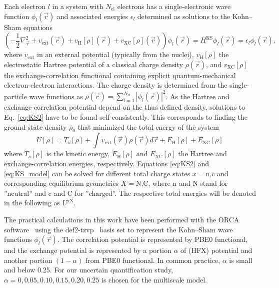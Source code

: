 \documentclass[letterpaper,12pt]{article}
\begin{document}
Each electron $l$ in a system with $N_\text{el}$ electrons has a single-electronic wave function $\phi_l (\vec{r})$ and associated energies $\epsilon_l$ determined as solutions to the Kohn--Sham equations~\cite{kohn_self_1965}
%
\begin{equation}
    \left(-\frac{1}{2}\nabla^2_{\vec{r}} + v_\text{ext}(\vec{r}) + v_\text{H}[\rho](\vec{r}) + v_\text{XC}[\rho](\vec{r})\right) \phi_l(\vec{r}) = H^\text{KS} \phi_l(\vec{r}) = \epsilon_l \phi_l (\vec{r}) ,
    \label{eq:KS2}
\end{equation}
%
where $v_\text{ext}$ in an external potential (typically from the nuclei), $v_\text{H}[\rho]$ the electrostatic Hartree potential of a classical charge density $\rho(\vec{r})$, and $v_\text{XC}[\rho]$ the exchange-correlation functional containing explicit quantum-mechanical electron-electron interactions. The charge density is determined from the single-particle wave functions as $\rho(\vec{r})=\sum\limits_{l=1}^{N_\text{el}} \left\vert\phi_l(\vec{r})\right\vert^2$. As the Hartree and exchange-correlation potential depend on the thus defined density, solutions to Eq.~\ref{eq:KS2} have to be found self-consistently. This corresponds to finding the ground-state density $\rho_0$ that minimized the total energy of the system
%
\begin{equation}
    U[\rho] = T_s[\rho] + \int v_\text{ext}(\vec{r}) \rho(\vec{r}) d \vec{r} + E_\text{H}[\rho] + E_\text{XC}[\rho]
    \label{eq:KS_model}
\end{equation}
%
where $T_s[\rho]$ is the kinetic energy, $E_\text{H}[\rho]$ and $E_\text{XC}[\rho]$ the Hartree and exchange-correlation energies, respectively. Equations \ref{eq:KS2} and \ref{eq:KS_model} can be solved for different total charge states $x=\text{n,c}$ and corresponding  equilibrium geometries $X=\text{N,C}$, where $\text{n}$ and $\text{N}$ stand for ''neutral'' and $\text{c}$ and $\text{C}$ for ''charged''. The respective total energies will be denoted in the following as $U^\text{xX}$.

The practical calculations in this work have been performed with the ORCA software~\cite{Neese2012a} using the def2-tzvp~\cite{weigend_accurate_2006} basis set to represent the Kohn--Sham wave functions $\phi_l(\vec{r})$. 
The correlation potential is represented by PBE0 functional, and the exchange potential is represented by a portion $\alpha$ of (HFX) potential and another portion $(1-\alpha)$ from PBE0 functional. In common practice, $\alpha$ is small and below 0.25. For our uncertain quantification study, $\alpha=0,0.05,0.10,0.15,0.20,0.25$ is chosen for the multiscale model.
\end{document}
